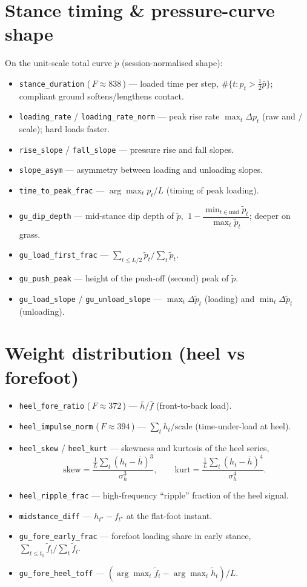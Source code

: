 \documentclass[11pt]{article}
\newcommand{\code}[1]{\texttt{#1}}
\newcommand{\Fval}[1]{{\small(\,$F\!\approx\!#1$\,)}}
\begin{document}
\section{Stance timing \& pressure-curve shape}
On the unit-scale total curve $\tilde p$ (session-normalised shape):
\begin{itemize}
  \item \code{stance_duration} \Fval{838} --- loaded time per step,
  $\#\{t: p_t>\tfrac12\bar p\}$; compliant ground softens/lengthens contact.
  \item \code{loading_rate} / \code{loading_rate_norm} --- peak rise rate $\max_t \Delta p_t$ (raw
  and $/$scale); hard loads faster.
  \item \code{rise_slope} / \code{fall_slope} --- pressure rise and fall slopes.
  \item \code{slope_asym} --- asymmetry between loading and unloading slopes.
  \item \code{time_to_peak_frac} --- $\arg\max_t p_t / L$ (timing of peak loading).
  \item \code{gu_dip_depth} --- mid-stance dip depth of $\tilde p$,
  $\ 1-\dfrac{\min_{t\in\text{mid}}\tilde p_t}{\max_t \tilde p_t}$; deeper on grass.
  \item \code{gu_load_first_frac} --- $\sum_{t\le L/2}\tilde p_t\big/\sum_t \tilde p_t$.
  \item \code{gu_push_peak} --- height of the push-off (second) peak of $\tilde p$.
  \item \code{gu_load_slope} / \code{gu_unload_slope} --- $\max_t \Delta\tilde p_t$ (loading) and
  $\min_t \Delta\tilde p_t$ (unloading).
\end{itemize}

\section{Weight distribution (heel vs forefoot)}
\begin{itemize}
  \item \code{heel_fore_ratio} \Fval{372} --- $\bar h/\bar f$ (front-to-back load).
  \item \code{heel_impulse_norm} \Fval{394} --- $\sum_t h_t/\text{scale}$ (time-under-load at heel).
  \item \code{heel_skew} / \code{heel_kurt} --- skewness and kurtosis of the heel series,
  \[
  \text{skew}=\frac{\tfrac1L\sum_t (h_t-\bar h)^3}{\sigma_h^{3}},\qquad
  \text{kurt}=\frac{\tfrac1L\sum_t (h_t-\bar h)^4}{\sigma_h^{4}} .
  \]
  \item \code{heel_ripple_frac} --- high-frequency ``ripple'' fraction of the heel signal.
  \item \code{midstance_diff} --- $h_{t^\star}-f_{t^\star}$ at the flat-foot instant.
  \item \code{gu_fore_early_frac} --- forefoot loading share in early stance,
  $\sum_{t\le t_0}\tilde f_t/\sum_t\tilde f_t$.
  \item \code{gu_fore_heel_toff} --- $(\arg\max_t \tilde f_t-\arg\max_t \tilde h_t)/L$.
\end{itemize}
\end{document}
